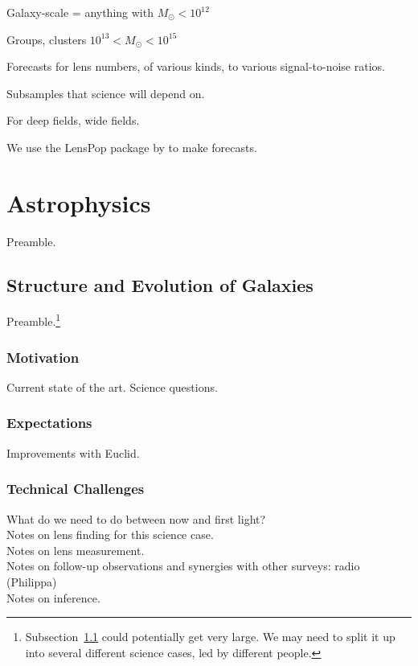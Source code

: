 \documentclass[twocolumn]{svjour3}
\begin{document}

Galaxy-scale = anything with $ M_{\odot} < 10^{12}$

Groups, clusters $ 10^{13}< M_{\odot} < 10^{15}$

Forecasts for lens numbers, of various kinds, to various signal-to-noise ratios.

Subsamples that science will depend on.

For deep fields, wide fields.

We use the {\sc LensPop} package by \citet{Collett2015} to make
forecasts.


\section{Astrophysics}

Preamble.



\subsection{Structure and Evolution of Galaxies}
\label{sec:lensgalaxies}



Preamble.\footnote{Subsection~\ref{sec:lensgalaxies} could potentially
get very large. We may need to split it up into several different
science cases, led by different people.}

\subsubsection{Motivation}
Current state of the art. Science questions.\\

\subsubsection{Expectations}
Improvements with Euclid.\\

\subsubsection{Technical Challenges}
What do we need to do between now and first light?\\
Notes on lens finding for this science case.\\
Notes on lens measurement.\\
Notes on follow-up observations and synergies with other surveys: radio
(Philippa) \\
Notes on inference.\\
\end{document}
